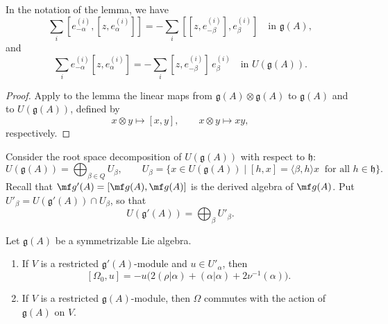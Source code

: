 \documentclass[12pt]{article}
\begin{document}
\begin{corollary}
    In the notation of the lemma, we have
    \[
        \sum_i [e_{-\alpha}^{(i)},[z,e_\alpha^{(i)}]]
        = -\sum_i [[z,e_{-\beta}^{(i)}],e_\beta^{(i)}] \quad \text{in } \mathfrak{g}(A),
    \]
    and
    \[
        \sum_i e_{-\alpha}^{(i)}[z,e_\alpha^{(i)}]
        = -\sum_i [z,e_{-\beta}^{(i)}]\, e_\beta^{(i)} \quad \text{in } U(\mathfrak{g}(A)).
    \]
\end{corollary}

\begin{proof}
    Apply to the lemma the linear maps from $\mathfrak{g}(A)\otimes \mathfrak{g}(A)$ to $\mathfrak{g}(A)$ and to $U(\mathfrak{g}(A))$, defined by
    \[
        x\otimes y \mapsto [x,y],
        \qquad
        x\otimes y \mapsto xy,
    \]
    respectively.
\end{proof}

Consider the root space decomposition of $U(\mathfrak{g}(A))$ with respect to $\mathfrak{h}$:
\[
    U(\mathfrak{g}(A)) = \bigoplus_{\beta \in Q} U_\beta, \qquad
    U_\beta = \{ x \in U(\mathfrak{g}(A)) \mid [h,x] = \langle \beta,h\rangle x \;\;\text{for all } h \in \mathfrak{h}\}.
\]
Recall that $\mf g'(A) = [\mf g(A),\mf g(A)]$ is the derived algebra of $\mf g(A)$. Put $U'_\beta = U(\mathfrak{g}'(A)) \cap U_\beta$, so that
\[
    U(\mathfrak{g}'(A)) = \bigoplus_\beta U'_\beta.
\]

\begin{theorem}[\label{thm:Casimir-commutes}]
    Let $\mathfrak{g}(A)$ be a symmetrizable Lie algebra.
    \begin{enumerate}[label=\alph*)]
        \item If $V$ is a restricted $\mathfrak{g}'(A)$-module and $u \in U'_\alpha$, then
              \[
                  [\Omega_0,u] = -u\Big( 2(\rho|\alpha) + (\alpha|\alpha) + 2\nu^{-1}(\alpha)\Big).
              \]
        \item If $V$ is a restricted $\mathfrak{g}(A)$-module, then $\Omega$ commutes with the action of $\mathfrak{g}(A)$ on $V$.
    \end{enumerate}
\end{theorem}
\end{document}
